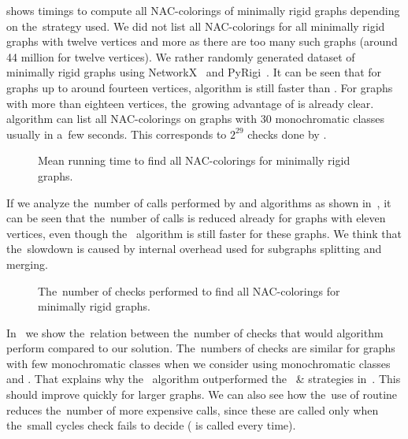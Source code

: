 shows timings to compute all NAC-colorings of minimally rigid graphs
depending on the~strategy used.
We did not list all NAC-colorings for all minimally rigid graphs with twelve vertices and more
as there are too many such graphs (around 44 million for twelve vertices).
%
We rather randomly generated dataset of minimally rigid graphs
using NetworkX~\cite{networkx} and PyRigi~\cite{pyrigi}.
%
It can be seen that for graphs up to around fourteen vertices, \NaiveCycles{} algorithm
is still faster than \Subgraphs{}.
For graphs with more than eighteen vertices,
the~growing advantage of \Subgraphs{} is already clear.
\Subgraphs{} algorithm can list all NAC-colorings on graphs with 30 monochromatic classes
usually in a~few seconds.
This corresponds to \( 2^{29} \) checks done by \NaiveCycles{}.

\begin{figure}[ht]
	\centering
	\scalebox{\BenchFigureScale}{}
	\caption[Running time for minimally rigid graphs]{
		Mean running time to find all NAC-colorings for minimally rigid graphs.}%
	\label{fig:graph_time_minimally_rigid}
\end{figure}%

If we analyze the~number of \IsNACColoring{} calls performed by \NaiveCycles{} and \Subgraphs{} algorithms
as shown in~,
it can be seen that the~number of \IsNACColoring{} calls is reduced already for graphs
with eleven vertices,
even though the~\NaiveCycles{} algorithm is still faster for these graphs.
%
We think that the~slowdown is caused by internal overhead
used for subgraphs splitting and merging.

\begin{figure}[ht]
	\centering
	\scalebox{\BenchFigureScale}{}
	\caption[Checks performed for minimally rigid graphs]{
		The~number of checks performed to find all NAC-colorings for minimally rigid graphs.}%
	\label{fig:graph_count_minimally_rigid}
\end{figure}%

In~
we show the~relation between the~number of \IsNACColoring{} checks that
would \Naive{} algorithm perform compared to our solution.
%
The~numbers of checks are similar for graphs with few monochromatic classes
when we consider \NaiveCycles{} using monochromatic classes and \Subgraphs{}.
That explains why the~\NaiveCycles{} algorithm outperformed
the~\NeighborsDegree{} \& \MergeLinear{} strategies in~. This should improve quickly for larger graphs.
We can also see how the~use of \CycleMask{} routine
reduces the~number of more expensive \IsNACColoring{} calls,
since these are called only when the~small cycles check \CycleMask{} fails to decide
(\CycleMask{} is called every time).

